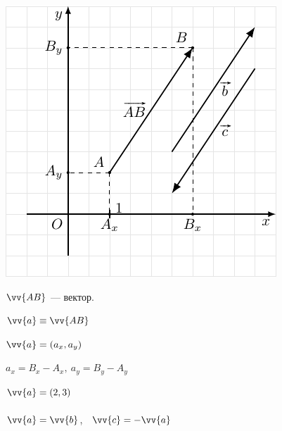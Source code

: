 \documentclass[10pt]{beamer}
\begin{document}
    {
    	{
    		 
			\includegraphics{vector.pdf}
    		

    	}
    	{
    		$\vv{AB}$ --- вектор.
    		
    		$ \vv{a} \equiv \vv{AB}$
    		
    		$\vv{a} = (a_x, a_y) $
    		
    		$a_x = B_x - A_x, \ a_y = B_y - A_y$
    		
	     	\hfill
	     	
	     	$\vv{a} = (2, 3)$	 \\  ~ \\
	     	
	     	$\vv{a\mathstrut} = \vv{b\mathstrut}$, \ $\vv{c\mathstrut} = -\vv{a\mathstrut}$
	     	
	     
    		
              
    		
    	}

    }
    
\end{document}
